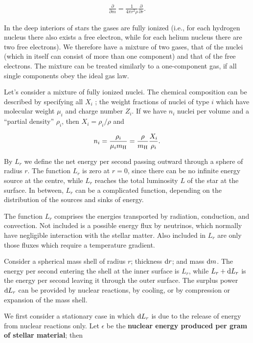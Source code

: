 \documentclass[a4paper,10pt]{article}
\begin{document}
\begin{align*}
    \frac{\partial}{\partial m} = \frac{1}{4\pi r^2\rho} \frac{\partial}{\partial r}.
\end{align*}

{\noindent}In the deep interiors of stars the gases are fully ionized (i.e., for each hydrogen nucleus there also exists a free electron, while for each helium nucleus there are two free electrons). We therefore have a mixture of two gases, that of the nuclei (which in itself can consist of more than one component) and that of the free electrons. The mixture can be treated similarly to a one-component gas, if all single components obey the ideal gas law.

{\noindent}Let's consider a mixture of fully ionized nuclei. The chemical composition can be described by specifying all $X_i$ ; the weight fractions of nuclei of type $i$ which have molecular weight $\mu_i$ and charge number $Z_i$. If we have $n_i$ nuclei per volume and a ``partial density'' $\rho_i$, then $X_i=\rho_i/\rho$ and

\begin{align*}
    n_i = \frac{\rho_i}{\mu_im_{\rm H}} = \frac{\rho}{m_{\rm H}} \frac{X_i}{\rho_i}.
\end{align*}

{\noindent}By $L_r$ we define the net energy per second passing outward through a sphere of radius $r$. The function $L_r$ is zero at $r=0$, since there can be no infinite energy source at the centre, while $L_r$ reaches the total luminosity $L$ of the star at the surface. In between, $L_r$ can be a complicated function, depending on the distribution of the sources and sinks of energy.

{\noindent}The function $L_r$ comprises the energies transported by radiation, conduction, and convection. Not included is a possible energy flux by neutrinos, which normally have negligible interaction with the stellar matter. Also included in $L_r$ are only those fluxes which require a temperature gradient.

{\noindent}Consider a spherical mass shell of radius $r$; thickness ${\rm d}r$; and mass ${\rm d}m$. The energy per second entering the shell at the inner surface is $L_r$, while $L_r+{\rm d}L_r$ is the energy per second leaving it through the outer surface. The surplus power ${\rm d}L_r$ can be provided by nuclear reactions, by cooling, or by compression or expansion of the mass shell.

{\noindent}We first consider a stationary case in which ${\rm d}L_r$ is due to the release of energy from nuclear reactions only. Let $\epsilon$ be the \textbf{nuclear energy produced per gram of stellar material}; then
\end{document}
